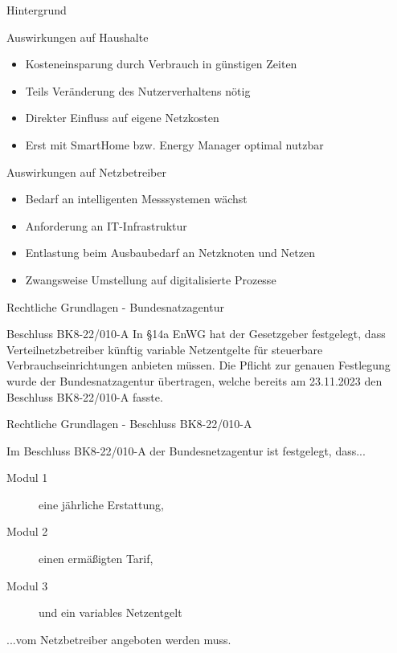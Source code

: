 \begin{frame}[allowframebreaks]{Hintergrund}
    \begin{block}{Auswirkungen auf Haushalte}
        \begin{itemize}
            \item Kosteneinsparung durch Verbrauch in günstigen Zeiten
            \item Teils Veränderung des Nutzerverhaltens nötig
            \item Direkter Einfluss auf eigene Netzkosten
            \item Erst mit SmartHome bzw. Energy Manager optimal nutzbar
        \end{itemize}
    \end{block}
    \begin{block}{Auswirkungen auf Netzbetreiber}
        \begin{itemize}
            \item Bedarf an intelligenten Messsystemen wächst
            \item Anforderung an IT-Infrastruktur
            \item Entlastung beim Ausbaubedarf an Netzknoten und Netzen
            \item Zwangsweise Umstellung auf digitalisierte Prozesse
        \end{itemize}
    \end{block}
\end{frame}

\begin{frame}{Rechtliche Grundlagen - Bundesnatzagentur}
    \begin{block}{Beschluss BK8-22/010-A}
        In §14a EnWG \cite{EnWG2024} hat der Gesetzgeber festgelegt, dass Verteilnetzbetreiber künftig variable Netzentgelte für steuerbare Verbrauchseinrichtungen anbieten müssen. 
        Die Pflicht zur genauen Festlegung wurde der Bundesnatzagentur übertragen, 
        welche bereits am 23.11.2023 den Beschluss BK8-22/010-A\cite{BNetzA-BK8-22-010-A} fasste.
    \end{block}
\end{frame}
   
\begin{frame}{Rechtliche Grundlagen - Beschluss BK8-22/010-A}

   Im Beschluss BK8-22/010-A\cite{BNetzA-BK8-22-010-A} der Bundesnetzagentur ist festgelegt, dass...
   \vspace{0.5cm}
   \begin{description}
      \item[Modul 1] eine jährliche Erstattung,
      \item[Modul 2] einen ermäßigten Tarif,
      \item[Modul 3] und ein variables Netzentgelt
   \end{description}
   \vspace{0.5cm}
   ...vom Netzbetreiber angeboten werden muss. 
\end{frame}
   

